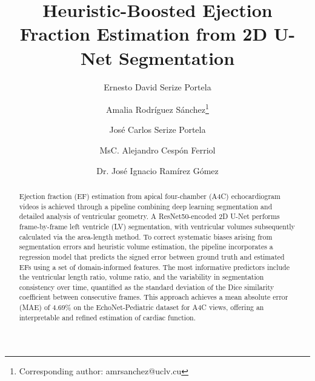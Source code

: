 \documentclass[runningheads]{llncs}
\begin{document}
%
\title{Heuristic-Boosted Ejection Fraction Estimation from 2D U-Net Segmentation}
%
%
\author{Ernesto David Serize Portela \and
Amalia Rodríguez Sánchez\thanks{Corresponding author: amrsanchez@uclv.cu}  \and
José Carlos Serize Portela \and
MsC. Alejandro Cespón Ferriol \and
Dr. José Ignacio Ramírez Gómez}


%
\maketitle              %
%
\begin{abstract}

Ejection fraction (EF) estimation from apical four-chamber (A4C) echocardiogram videos is achieved through a pipeline combining deep learning segmentation and detailed analysis of ventricular geometry. A ResNet50-encoded 2D U-Net performs frame-by-frame left ventricle (LV) segmentation, with ventricular volumes subsequently calculated via the area-length method. To correct systematic biases arising from segmentation errors and heuristic volume estimation, the pipeline incorporates a regression model that predicts the signed error between ground truth and estimated EFs using a set of domain-informed features. The most informative predictors include the ventricular length ratio, volume ratio, and the variability in segmentation consistency over time, quantified as the standard deviation of the Dice similarity coefficient between consecutive frames. This approach achieves a mean absolute error (MAE) of 4.69\% on the EchoNet-Pediatric dataset for A4C views, offering an interpretable and refined estimation of cardiac function. 



\end{abstract}
\end{document}
